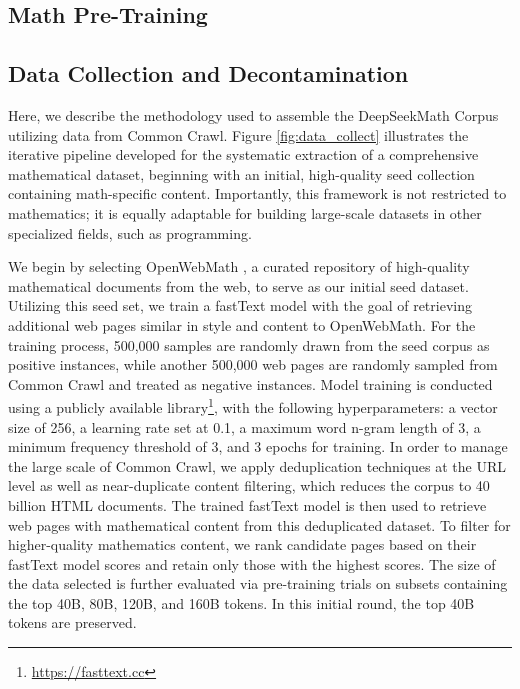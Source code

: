 \begin{itemize}[topsep=0pt]
\section{Math Pre-Training}

\subsection{Data Collection and Decontamination} Here, we describe the methodology used to assemble the DeepSeekMath Corpus utilizing data from Common Crawl. Figure \ref{fig:data_collect} illustrates the iterative pipeline developed for the systematic extraction of a comprehensive mathematical dataset, beginning with an initial, high-quality seed collection containing math-specific content. Importantly, this framework is not restricted to mathematics; it is equally adaptable for building large-scale datasets in other specialized fields, such as programming.

We begin by selecting OpenWebMath \citep{openwebmath}, a curated repository of high-quality mathematical documents from the web, to serve as our initial seed dataset. Utilizing this seed set, we train a fastText model \citep{joulin2016fasttext} with the goal of retrieving additional web pages similar in style and content to OpenWebMath. For the training process, 500,000 samples are randomly drawn from the seed corpus as positive instances, while another 500,000 web pages are randomly sampled from Common Crawl and treated as negative instances. Model training is conducted using a publicly available library\footnote{\url{https://fasttext.cc}}, with the following hyperparameters: a vector size of 256, a learning rate set at 0.1, a maximum word n-gram length of 3, a minimum frequency threshold of 3, and 3 epochs for training. In order to manage the large scale of Common Crawl, we apply deduplication techniques at the URL level as well as near-duplicate content filtering, which reduces the corpus to 40 billion HTML documents. The trained fastText model is then used to retrieve web pages with mathematical content from this deduplicated dataset. To filter for higher-quality mathematics content, we rank candidate pages based on their fastText model scores and retain only those with the highest scores. The size of the data selected is further evaluated via pre-training trials on subsets containing the top 40B, 80B, 120B, and 160B tokens. In this initial round, the top 40B tokens are preserved.


\end{itemize}
